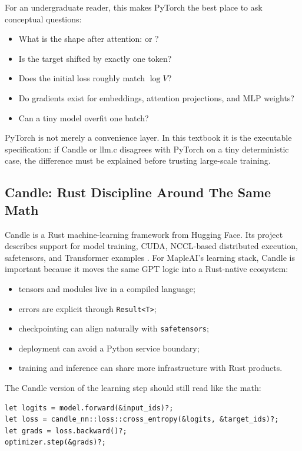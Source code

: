 For an undergraduate reader, this makes PyTorch the best place to ask conceptual
questions:

\begin{itemize}
  \item What is the shape after attention: \shape{[B,T,C]} or \shape{[B,H,T,D]}?
  \item Is the target shifted by exactly one token?
  \item Does the initial loss roughly match \(\log V\)?
  \item Do gradients exist for embeddings, attention projections, and MLP weights?
  \item Can a tiny model overfit one batch?
\end{itemize}

PyTorch is not merely a convenience layer. In this textbook it is the executable
specification: if Candle or llm.c disagrees with PyTorch on a tiny deterministic case,
the difference must be explained before trusting large-scale training.

\subsection{Candle: Rust Discipline Around The Same Math}

Candle is a Rust machine-learning framework from Hugging Face. Its project describes
support for model training, CUDA, NCCL-based distributed execution, safetensors, and
Transformer examples \cite{huggingfacecandle}. For MapleAI's learning stack, Candle is
important because it moves the same GPT logic into a Rust-native ecosystem:

\begin{itemize}
  \item tensors and modules live in a compiled language;
  \item errors are explicit through \texttt{Result<T>};
  \item checkpointing can align naturally with \texttt{safetensors};
  \item deployment can avoid a Python service boundary;
  \item training and inference can share more infrastructure with Rust products.
\end{itemize}

The Candle version of the learning step should still read like the math:

\begin{lstlisting}
let logits = model.forward(&input_ids)?;
let loss = candle_nn::loss::cross_entropy(&logits, &target_ids)?;
let grads = loss.backward()?;
optimizer.step(&grads)?;
\end{lstlisting}

